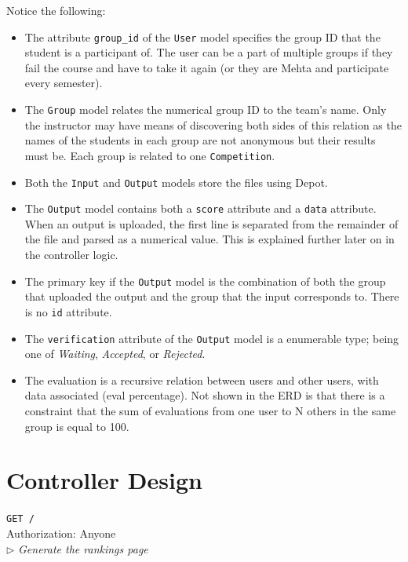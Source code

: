 \documentclass[12pt]{article}
\newcommand\ctrltitle[1]{\par\medskip\texttt{\large #1}\\}
\newcommand\ctrlauth[1]{Authorization: #1\\}
\newcommand\ctrldesc[1]{$\rhd$ \textsl{#1}\par\medskip}
\begin{document}
Notice the following:

\begin{itemize}
    \item The attribute \texttt{group\_id} of the \texttt{User} model specifies
        the group ID that the student is a participant of. The user can be a
        part of multiple groups if they fail the course and have to take it
        again (or they are Mehta and participate every semester).
    \item The \texttt{Group} model relates the numerical group ID to the team's
        name. Only the instructor may have means of discovering both sides of
        this relation as the names of the students in each group are not
        anonymous but their results must be. Each group is related to one
        \texttt{Competition}.
    \item Both the \texttt{Input} and \texttt{Output} models store the files
        using Depot.
    \item The \texttt{Output} model contains both a \texttt{score} attribute
        and a \texttt{data} attribute. When an output is uploaded, the first
        line is separated from the remainder of the file and parsed as a
        numerical value. This is explained further later on in the controller
        logic.
    \item The primary key if the \texttt{Output} model is the combination of
        both the group that uploaded the output and the group that the input
        corresponds to. There is no \texttt{id} attribute.
    \item The \texttt{verification} attribute of the \texttt{Output} model is a
        enumerable type; being one of \emph{Waiting}, \emph{Accepted}, or
        \emph{Rejected}.
    \item The evaluation is a recursive relation between users and other users,
        with data associated (eval percentage). Not shown in the ERD is that
        there is a constraint that the sum of evaluations from one user to N
        others in the same group is equal to 100.
\end{itemize}

\clearpage

\section{Controller Design}

\ctrltitle{GET /}
\ctrlauth{Anyone}
\ctrldesc{Generate the rankings page}
\end{document}
